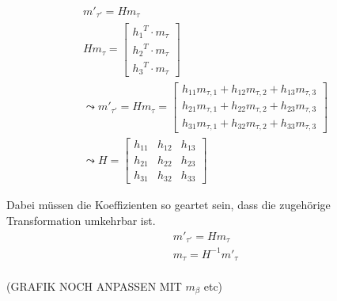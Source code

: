 \begin{gather}
	m'_{\tau'} = Hm_{\tau}\\
	Hm_{\tau} = \begin{bmatrix}
	{h_1}^T \cdot m_{\tau}\\{h_2}^T \cdot m_{\tau}\\{h_3}^T \cdot m_{\tau}
	\end{bmatrix} \\
	\leadsto 
	m'_{\tau'}= Hm_{\tau}= \begin{bmatrix}
	h_{11}m_{\tau,1}+h_{12}m_{\tau,2}+h_{13}m_{\tau,3}\\
	h_{21}m_{\tau,1}+h_{22}m_{\tau,2}+h_{23}m_{\tau,3}\\
	h_{31}m_{\tau,1}+h_{32}m_{\tau,2}+h_{33}m_{\tau,3}
	\end{bmatrix}\\
	\leadsto 
	H=\begin{bmatrix}
	h_{11}&h_{12}&h_{13}\\
	h_{21}&h_{22}&h_{23}\\
	h_{31}&h_{32}&h_{33}
	\end{bmatrix}
\end{gather}

Dabei müssen die Koeffizienten so geartet sein, dass die zugehörige Transformation umkehrbar ist\cite{HZ}\cite{Peiffer}.
\begin{gather}
	m'_{\tau'}=Hm_\tau\\
	m_\tau= H^{-1}m'_{\tau}
\end{gather}\\


(GRAFIK NOCH ANPASSEN MIT $m_\beta$ etc)\\


